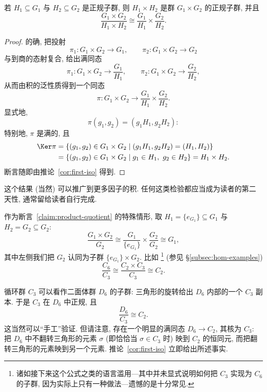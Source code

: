 \begin{claim}
\label{claim:product-quotient}
若 $H_1 \subseteq G_1$ 与 $H_2 \subseteq G_2$ 是正规子群, 则 $H_1 \times H_2$ 是群 $G_1 \times G_2$ 的正规子群, 并且
\[
\frac{G_1 \times G_2}{H_1 \times H_2} \cong \frac{G_1}{H_1} \times \frac{G_2}{H_2}.
\]
\end{claim}

\begin{proof}
的确, 把投射
\[
\pi_1 : G_1 \times G_2 \rightarrow G_1, \qquad \pi_2 : G_1 \times G_2 \rightarrow G_2
\]
与到商的态射复合, 给出满同态
\[
\pi_1 : G_1 \times G_2 \rightarrow \frac{G_1}{H_1}, \qquad \pi_2 : G_1 \times G_2 \rightarrow \frac{G_2}{H_2},
\]
从而由积的泛性质得到一个同态
\[
\pi : G_1 \times G_2 \rightarrow \frac{G_1}{H_1} \times \frac{G_2}{H_2}.
\]
显式地,
\[
\pi(g_1, g_2) = (g_1 H_1, g_2 H_2):
\]
特别地, $\pi$ 是满的, 且
\begin{align*}
\Ker \pi &= \{(g_1, g_2) \in G_1 \times G_2 \mid (g_1 H_1, g_2 H_2) = (H_1, H_2)\} \\
&= \{(g_1, g_2) \in G_1 \times G_2 \mid g_1 \in H_1,\ g_2 \in H_2\} = H_1 \times H_2.
\end{align*}
断言随即由推论~\ref{cor:first-iso} 得到.
\end{proof}

这个结果 (当然) 可以推广到更多因子的积. 任何这类检验都应当成为读者的第二天性, 通常留给读者自行完成.

\begin{example}
\label{ex:C6-C3}
作为断言~\ref{claim:product-quotient} 的特殊情形, 取 $H_1 = \{e_{G_1}\} \subseteq G_1$ 与 $H_2 = G_2 \subseteq G_2$:
\[
\frac{G_1 \times G_2}{G_2} \cong \frac{G_1}{\{e_{G_1}\}} \times \frac{G_2}{G_2} \cong G_1,
\]
其中左侧我们把 $G_2$ 认同为子群 $\{e_{G_1}\} \times G_2$. 比如%
\footnote{诸如接下来这个公式之类的语言滥用---其中并未显式说明如何把 $C_3$ 实现为 $C_6$ 的子群, 因为实际上只有一种做法---遗憾的是十分常见.}%
(参见 \S\ref{subsec:hom-examples})
\[
\frac{C_6}{C_3} \cong \frac{C_2 \times C_3}{C_3} \cong C_2.
\]
\end{example}

\begin{example}
\label{ex:D6-C3}
循环群 $C_3$ 可以看作二面体群 $D_6$ 的子群: 三角形的旋转给出 $D_6$ 内部的一个 $C_3$ 副本. 于是 $C_3$ 在 $D_6$ 中正规, 且
\[
\frac{D_6}{C_3} \cong C_2.
\]
这当然可以``手工''验证. 但请注意, 存在一个明显的满同态 $D_6 \to C_2$, 其核为 $C_3$: 把 $D_6$ 中不翻转三角形的元素 $\sigma$ (即恰恰当 $\sigma \in C_3$ 时) 映到 $C_2$ 的恒同元, 而把翻转三角形的元素映到另一个元素. 推论~\ref{cor:first-iso} 立即给出所述事实.
\end{example}

